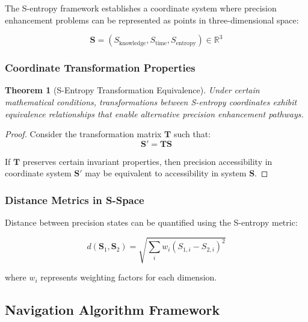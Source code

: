 \documentclass[12pt,a4paper]{article}
\newtheorem{theorem}{Theorem}[section]
\begin{document}
{{{{{{{{{{{{{The S-entropy framework establishes a coordinate system where precision enhancement problems can be represented as points in three-dimensional space:

\begin{equation}
\mathbf{S} = (S_{\text{knowledge}}, S_{\text{time}}, S_{\text{entropy}}) \in \mathbb{R}^3
\label{eq:tri_dimensional_coordinates}
\end{equation}

\subsubsection{Coordinate Transformation Properties}

\begin{theorem}[S-Entropy Transformation Equivalence]
Under certain mathematical conditions, transformations between S-entropy coordinates exhibit equivalence relationships that enable alternative precision enhancement pathways.
\end{theorem}

\begin{proof}
Consider the transformation matrix $\mathbf{T}$ such that:
\begin{equation}
\mathbf{S}' = \mathbf{T} \mathbf{S}
\label{eq:coordinate_transformation}
\end{equation}

If $\mathbf{T}$ preserves certain invariant properties, then precision accessibility in coordinate system $\mathbf{S}'$ may be equivalent to accessibility in system $\mathbf{S}$.
\end{proof}

\subsubsection{Distance Metrics in S-Space}

Distance between precision states can be quantified using the S-entropy metric:

\begin{equation}
d(\mathbf{S}_1, \mathbf{S}_2) = \sqrt{\sum_{i} w_i (S_{1,i} - S_{2,i})^2}
\label{eq:s_entropy_distance}
\end{equation}

where $w_i$ represents weighting factors for each dimension.

\subsection{Navigation Algorithm Framework}

}}}}}}}}}}}}}
\end{document}
